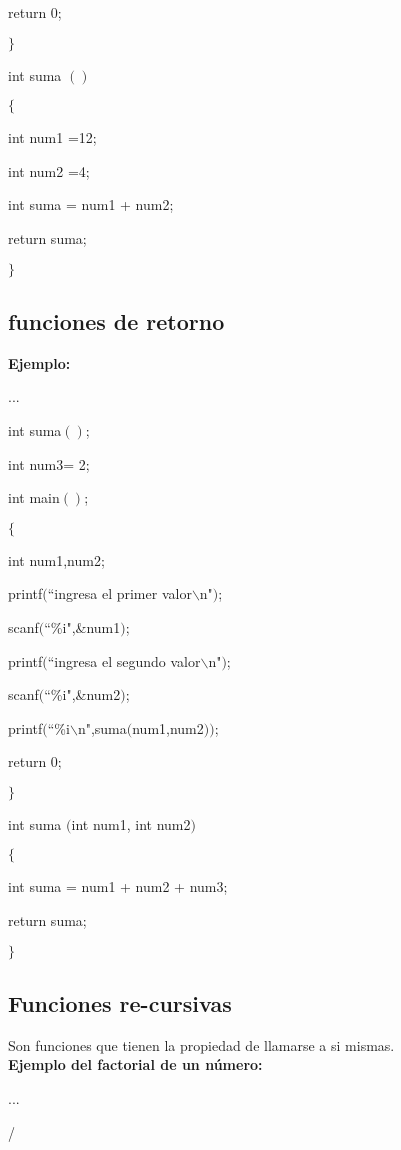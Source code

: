 \documentclass[]{article}
\begin{document}
	return 0;
	
	$\rbrace$
	
	int suma $()$
	
	$\lbrace$
	
	int num1 =12;
	
	int num2 =4;
	
	int suma = num1 + num2;
	
	return suma;
	
	$\rbrace$
	
	\subsection{funciones de retorno}
	
	\textbf{Ejemplo:\\}
	
	...
	
	int suma$()$;
	
	int num3= 2;
	
	int main$()$;
	
	$\lbrace$
	
	int num1,num2;
	
	printf$($``ingresa el primer valor$\backslash$n"$)$;
	
	scanf$($``\%i",\&num1$)$;
	
	printf$($``ingresa el segundo valor$\backslash$n"$)$;
	
	scanf$($``\%i",\&num2$)$;
	
	printf$($``\%i$\backslash$n",suma$($num1,num2$))$;
	
	return 0;
	
	$\rbrace$
	
	int suma $($int num1, int num2$)$
	
	$\lbrace$
	
	int suma = num1 + num2 + num3;
	
	return suma;
	
	$\rbrace$
	
	\subsection{Funciones re-cursivas}
	
	Son funciones que tienen la propiedad de llamarse a si mismas.\\
	
	\textbf{Ejemplo del factorial de un número:\\}
	
	...
	
	\slash*
	
\end{document}
